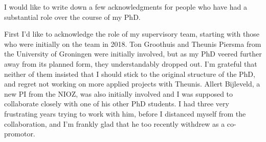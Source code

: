 \label{ch:ack}


\bigskip

\begingroup
\let\clearpage\relax
\let\cleardoublepage\relax
\let\cleardoublepage\relax

I would like to write down a few acknowledgments for people who have had a substantial role over the course of my PhD.

First I'd like to acknowledge the role of my supervisory team, starting with those who were initially on the team in 2018.
Ton Groothuis and Theunis Piersma from the University of Groningen were initially involved, but as my PhD veered further away from its planned form, they understandably dropped out.
I'm grateful that neither of them insisted that I should stick to the original structure of the PhD, and regret not working on more applied projects with Theunis.
Allert Bijleveld, a new PI from the NIOZ, was also initially involved and I was supposed to collaborate closely with one of his other PhD students.
I had three very frustrating years trying to work with him, before I distanced myself from the collaboration, and I'm frankly glad that he too recently withdrew as a co-promotor.

